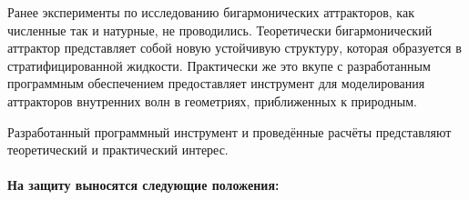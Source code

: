 Ранее эксперименты по исследованию бигармонических аттракторов, как численные так и натурные, не проводились. Теоретически бигармонический аттрактор представляет собой новую устойчивую структуру, которая образуется в стратифицированной жидкости. Практически же это вкупе с разработанным программным обеспечением предоставляет инструмент для моделирования аттракторов внутренних волн в геометриях, приближенных к природным.

Разработанный программный инструмент и проведённые расчёты представляют теоретический и практический интерес.

\newpage

\paragraph{На защиту выносятся следующие положения:}
